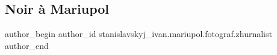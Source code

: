  
 
 
 
 

\subsection{Noir à Mariupol}
\label{sec:10_01_2019.fb.stanislavskyj_ivan.mariupol.fotograf.zhurnalist.1.noir___mariupol}

\ifcmt
 author_begin
   author_id stanislavskyj_ivan.mariupol.fotograf.zhurnalist
 author_end
\fi
